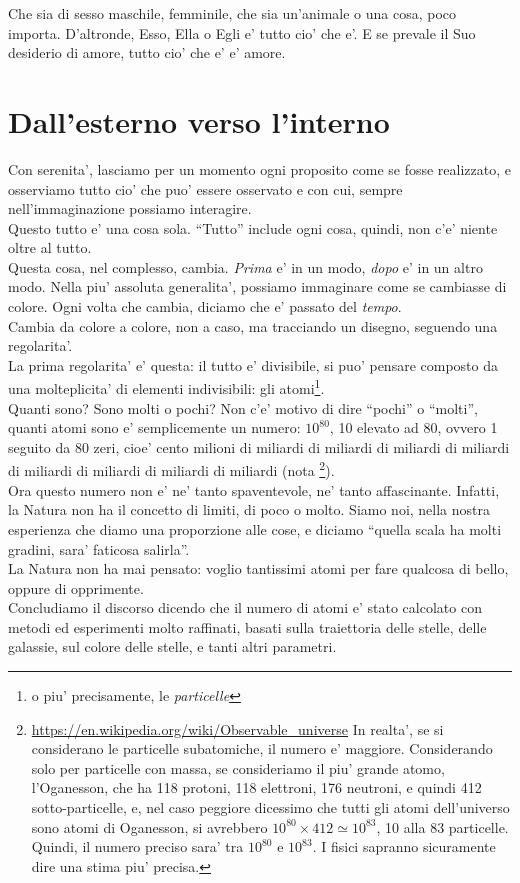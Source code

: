 Che sia di sesso maschile, femminile, che sia un'animale o una cosa, poco importa. D'altronde, Esso, Ella o Egli e' tutto cio' che e'. E se prevale il Suo desiderio di amore, tutto cio' che e' e' amore.

\section{Dall'esterno verso l'interno}
\label{extInt}

Con serenita', lasciamo per un momento ogni proposito come se fosse realizzato, e osserviamo tutto cio' che puo' essere osservato e con cui, sempre nell'immaginazione possiamo interagire.\\
Questo tutto e' una cosa sola. ``Tutto'' include ogni cosa, quindi, non c'e' niente oltre al tutto.\\
Questa cosa, nel complesso, cambia. \emph{Prima} e' in un modo, \emph{dopo} e' in un altro modo. Nella piu' assoluta generalita', possiamo immaginare come se cambiasse di colore. Ogni volta che cambia, diciamo che e' passato del \emph{tempo}.\\
Cambia da colore a colore, non a caso, ma tracciando un disegno, seguendo una regolarita'. \\

La prima regolarita' e' questa: il tutto e' divisibile, si puo' pensare composto da una molteplicita' di elementi indivisibili: gli atomi\footnote{o piu' precisamente, le \emph{particelle}}.\\
Quanti sono? Sono molti o pochi? Non c'e' motivo di dire ``pochi'' o ``molti'', quanti atomi sono  e' semplicemente un numero: $10^{80}$, 10 elevato ad 80, ovvero 1 seguito da 80 zeri, cioe' cento milioni di miliardi di miliardi di miliardi di miliardi di miliardi di miliardi di miliardi di miliardi (nota \footnote{\url{https://en.wikipedia.org/wiki/Observable\_universe} In realta', se si considerano le particelle subatomiche, il numero e' maggiore. Considerando solo per particelle con massa, se consideriamo il piu' grande atomo, l'Oganesson, che ha 118 protoni, 118 elettroni, 176 neutroni, e quindi 412 sotto-particelle, e, nel caso peggiore dicessimo che tutti gli atomi dell'universo sono atomi di Oganesson, si avrebbero $10^{80}\times 412 \simeq 10^{83}$, 10 alla 83 particelle. Quindi, il numero preciso sara' tra $10^{80}$ e $10^{83}$. I fisici sapranno sicuramente dire una stima piu' precisa.}). \\
Ora questo numero non e' ne' tanto spaventevole, ne' tanto affascinante. Infatti, la Natura non ha il concetto di limiti, di poco o molto. Siamo noi, nella nostra esperienza che diamo una proporzione alle cose, e diciamo ``quella scala ha molti gradini, sara' faticosa salirla''. \\
La Natura non ha mai pensato: voglio tantissimi atomi per fare qualcosa di bello, oppure di opprimente.\\
Concludiamo il discorso dicendo che il numero di atomi e' stato calcolato con metodi ed esperimenti molto raffinati, basati sulla traiettoria delle stelle, delle galassie, sul colore delle stelle, e tanti altri parametri.\\


